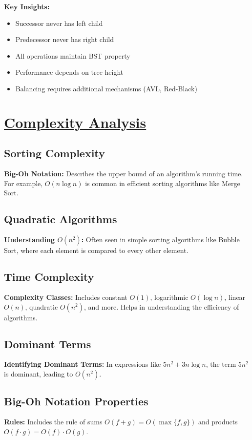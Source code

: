 \textbf{Key Insights:}
\begin{itemize}[noitemsep,leftmargin=*]
    \item Successor never has left child
    \item Predecessor never has right child
    \item All operations maintain BST property
    \item Performance depends on tree height
    \item Balancing requires additional mechanisms (AVL, Red-Black)
\end{itemize}

\clearpage
\section{\texorpdfstring{\underline{Complexity Analysis}}{Complexity Analysis}}

\subsection{Sorting Complexity}
\textbf{Big-Oh Notation:} Describes the upper bound of an algorithm's running time. For example, $O(n \log n)$ is common in efficient sorting algorithms like Merge Sort.

\subsection{Quadratic Algorithms}
\textbf{Understanding $O(n^2)$:} Often seen in simple sorting algorithms like Bubble Sort, where each element is compared to every other element.

\subsection{Time Complexity}
\textbf{Complexity Classes:} Includes constant $O(1)$, logarithmic $O(\log n)$, linear $O(n)$, quadratic $O(n^2)$, and more. Helps in understanding the efficiency of algorithms.

\subsection{Dominant Terms}
\textbf{Identifying Dominant Terms:} In expressions like $5n^2 + 3n \log n$, the term $5n^2$ is dominant, leading to $O(n^2)$.

\subsection{Big-Oh Notation Properties}
\textbf{Rules:} Includes the rule of sums $O(f + g) = O(\max\{f, g\})$ and products $O(f \cdot g) = O(f) \cdot O(g)$.


